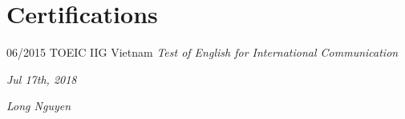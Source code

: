 \documentclass[]{friggeri-cv}
\begin{document}
\section{Certifications}
\begin{entrylist}
  \entry
    {06/2015}
    {TOEIC}
    {IIG Vietnam}
    {\emph{Test of English for International Communication}}
\end{entrylist}

\begin{flushleft}
\emph{Jul 17th, 2018}
\end{flushleft}
\begin{flushright}
\emph{Long Nguyen}
\end{flushright}
\end{document}
